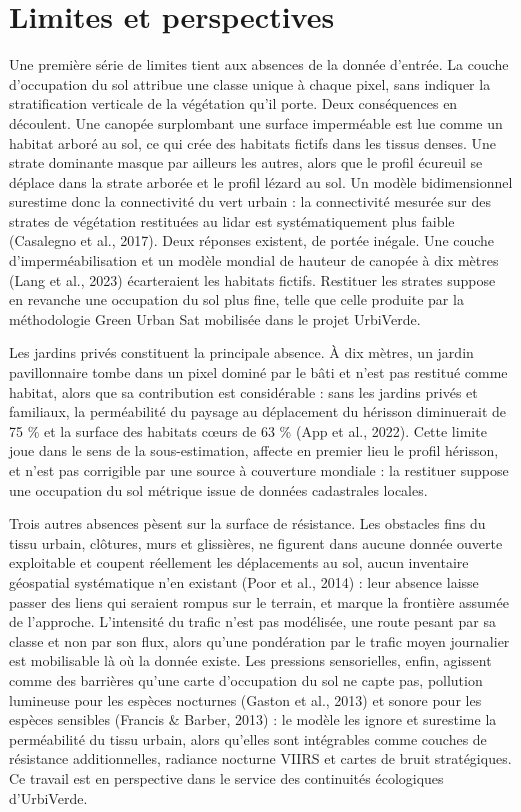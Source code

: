 \documentclass[a4paper,12pt]{report}
\begin{document}
\section{Limites et perspectives}
Une première série de limites tient aux absences de la donnée d'entrée. La couche d'occupation du sol attribue une classe unique à chaque pixel, sans indiquer la stratification verticale de la végétation qu'il porte. Deux conséquences en découlent. Une canopée surplombant une surface imperméable est lue comme un habitat arboré au sol, ce qui crée des habitats fictifs dans les tissus denses. Une strate dominante masque par ailleurs les autres, alors que le profil écureuil se déplace dans la strate arborée et le profil lézard au sol. Un modèle bidimensionnel surestime donc la connectivité du vert urbain : la connectivité mesurée sur des strates de végétation restituées au lidar est systématiquement plus faible (Casalegno et al., 2017). Deux réponses existent, de portée inégale. Une couche d'imperméabilisation et un modèle mondial de hauteur de canopée à dix mètres (Lang et al., 2023) écarteraient les habitats fictifs. Restituer les strates suppose en revanche une occupation du sol plus fine, telle que celle produite par la méthodologie Green Urban Sat mobilisée dans le projet UrbiVerde.
 
Les jardins privés constituent la principale absence. À dix mètres, un jardin pavillonnaire tombe dans un pixel dominé par le bâti et n'est pas restitué comme habitat, alors que sa contribution est considérable : sans les jardins privés et familiaux, la perméabilité du paysage au déplacement du hérisson diminuerait de 75 \% et la surface des habitats cœurs de 63 \% (App et al., 2022). Cette limite joue dans le sens de la sous-estimation, affecte en premier lieu le profil hérisson, et n'est pas corrigible par une source à couverture mondiale : la restituer suppose une occupation du sol métrique issue de données cadastrales locales.
 
Trois autres absences pèsent sur la surface de résistance. Les obstacles fins du tissu urbain, clôtures, murs et glissières, ne figurent dans aucune donnée ouverte exploitable et coupent réellement les déplacements au sol, aucun inventaire géospatial systématique n'en existant (Poor et al., 2014) : leur absence laisse passer des liens qui seraient rompus sur le terrain, et marque la frontière assumée de l'approche. L'intensité du trafic n'est pas modélisée, une route pesant par sa classe et non par son flux, alors qu'une pondération par le trafic moyen journalier est mobilisable là où la donnée existe. Les pressions sensorielles, enfin, agissent comme des barrières qu'une carte d'occupation du sol ne capte pas, pollution lumineuse pour les espèces nocturnes (Gaston et al., 2013) et sonore pour les espèces sensibles (Francis \& Barber, 2013) : le modèle les ignore et surestime la perméabilité du tissu urbain, alors qu'elles sont intégrables comme couches de résistance additionnelles, radiance nocturne VIIRS et cartes de bruit stratégiques. Ce travail est en perspective dans le service des continuités écologiques d'UrbiVerde.
 
\end{document}
